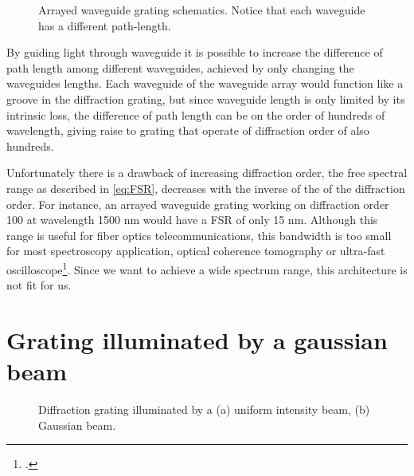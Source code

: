 \documentclass[12pt,twoside,english]{book}
\renewcommand{\~}{\perispomeni}%
\numberwithin{equation}{section}
\numberwithin{figure}{section}
\begin{document}
%
\begin{figure}[h]
\center{}
\caption{Arrayed waveguide grating schematics. Notice that each waveguide has a different path-length.\label{fig:awg}}

\end{figure}
By guiding light through waveguide it is possible to increase the difference of path length among different waveguides, achieved by only changing the waveguides lengths. Each waveguide of the waveguide array would function like a groove in the diffraction grating, but since waveguide length is only limited by its intrinsic loss, the difference of path length can be on the order of hundreds of wavelength, giving raise to grating that operate of diffraction order of also hundreds.

Unfortunately there is a drawback of increasing diffraction order, the free spectral range as described in \ref{eq:FSR}, decreases with the inverse of the of the diffraction order. For instance, an arrayed waveguide grating working on diffraction order 100 at wavelength 1500 nm would have a FSR of only 15 nm. Although this range is useful for fiber optics telecommunications, this bandwidth is too small for most spectroscopy application, optical coherence tomography or ultra-fast oscilloscope\footcite{Foster:2008p71}. Since we want to achieve a wide spectrum range, this architecture is not fit for us.

\section{Grating illuminated by a gaussian beam}
\label{section:Grating gaussian beam}

%
\begin{figure}[h]
\centering
\caption{Diffraction grating illuminated by a (a) uniform intensity beam, (b) Gaussian beam.\label{fig:square-gaussian}} 
\end{figure}
\end{document}
